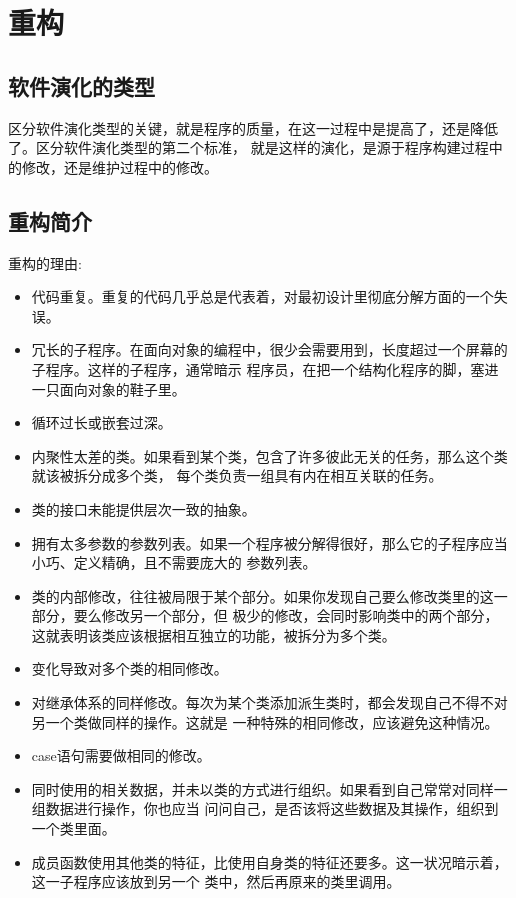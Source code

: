 \documentclass{article}
\begin{document}
\section{重构}
\subsection{软件演化的类型}
区分软件演化类型的关键，就是程序的质量，在这一过程中是提高了，还是降低了。区分软件演化类型的第二个标准，
就是这样的演化，是源于程序构建过程中的修改，还是维护过程中的修改。

\subsection{重构简介}
重构的理由:
\begin{itemize}
    \item 代码重复。重复的代码几乎总是代表着，对最初设计里彻底分解方面的一个失误。
    \item 冗长的子程序。在面向对象的编程中，很少会需要用到，长度超过一个屏幕的子程序。这样的子程序，通常暗示
    程序员，在把一个结构化程序的脚，塞进一只面向对象的鞋子里。
    \item 循环过长或嵌套过深。
    \item 内聚性太差的类。如果看到某个类，包含了许多彼此无关的任务，那么这个类就该被拆分成多个类，
    每个类负责一组具有内在相互关联的任务。
    \item 类的接口未能提供层次一致的抽象。
    \item 拥有太多参数的参数列表。如果一个程序被分解得很好，那么它的子程序应当小巧、定义精确，且不需要庞大的
    参数列表。
    \item 类的内部修改，往往被局限于某个部分。如果你发现自己要么修改类里的这一部分，要么修改另一个部分，但
    极少的修改，会同时影响类中的两个部分，这就表明该类应该根据相互独立的功能，被拆分为多个类。
    \item 变化导致对多个类的相同修改。
    \item 对继承体系的同样修改。每次为某个类添加派生类时，都会发现自己不得不对另一个类做同样的操作。这就是
    一种特殊的相同修改，应该避免这种情况。
    \item case语句需要做相同的修改。
    \item 同时使用的相关数据，并未以类的方式进行组织。如果看到自己常常对同样一组数据进行操作，你也应当
    问问自己，是否该将这些数据及其操作，组织到一个类里面。
    \item 成员函数使用其他类的特征，比使用自身类的特征还要多。这一状况暗示着，这一子程序应该放到另一个
    类中，然后再原来的类里调用。

\end{itemize}
\end{document}
